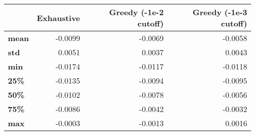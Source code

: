 \begin{tabular}{lrrr}
\toprule
{} &  Exhaustive &  Greedy (-1e-2 cutoff) &  Greedy (-1e-3 cutoff) \\
\midrule
\textbf{mean} &     -0.0099 &                -0.0069 &                -0.0058 \\
\textbf{std } &      0.0051 &                 0.0037 &                 0.0043 \\
\textbf{min } &     -0.0174 &                -0.0117 &                -0.0118 \\
\textbf{25\% } &     -0.0135 &                -0.0094 &                -0.0095 \\
\textbf{50\% } &     -0.0102 &                -0.0078 &                -0.0056 \\
\textbf{75\% } &     -0.0086 &                -0.0042 &                -0.0032 \\
\textbf{max } &     -0.0003 &                -0.0013 &                 0.0016 \\
\bottomrule
\end{tabular}
